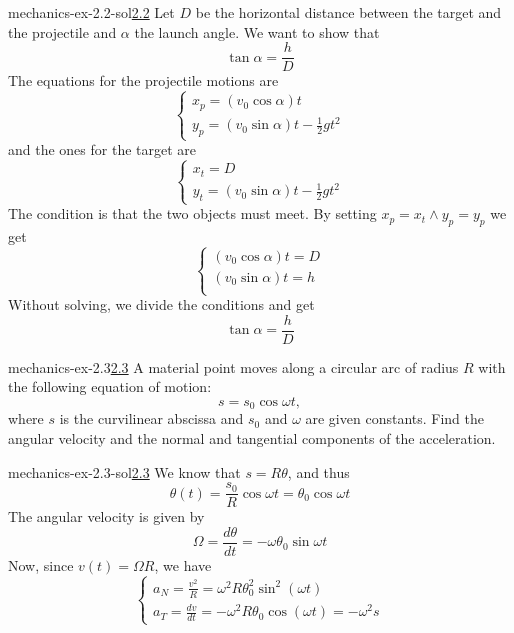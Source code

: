 \documentclass[preview]{standalone}
\begin{document}
\begin{snippetsolution}{mechanics-ex-2.2-sol}{\underline{2.2}}
    Let \(D\) be the horizontal distance between the target and the projectile
    and \(\alpha\) the launch angle.
    We want to show that
    \[
        \tan\alpha = \frac{h}{D}
    \]
    The equations for the projectile motions are
    \[
        \begin{cases}
            x_p = (v_0\cos\alpha)t \\
            y_p = (v_0\sin\alpha)t - \frac{1}{2}gt^2
        \end{cases}
    \]
    and the ones for the target are
    \[
        \begin{cases}
            x_t = D \\
            y_t = (v_0\sin\alpha)t - \frac{1}{2}gt^2
        \end{cases}
    \]
    The condition is that the two objects must meet.
    By setting \(x_p = x_t \land y_p = y_p\) we get
    \[
        \begin{cases}
            (v_0 \cos\alpha) t = D \\
            (v_0 \sin\alpha) t = h \\
        \end{cases}
    \]
    Without solving, we divide the conditions and get
    \[
        \tan\alpha = \frac{h}{D}
    \]
\end{snippetsolution}

\begin{snippetexercise}{mechanics-ex-2.3}{\underline{2.3}}
    A material point moves along a circular arc of radius \(R\) with the following equation of motion:
    \[
        s = s_0 \cos \omega t,
    \]
    where \(s\) is the curvilinear abscissa and \(s_0\) and \(\omega\) are given constants.
    Find the angular velocity and the normal and tangential components of the acceleration.
\end{snippetexercise}

\begin{snippetsolution}{mechanics-ex-2.3-sol}{\underline{2.3}}
    We know that \(s = R\theta\), and thus
    \[
        \theta(t) = \frac{s_0}{R} \cos \omega t = \theta_0 \cos \omega t
    \]
    The angular velocity is given by
    \[
        \Omega = \frac{d\theta}{dt} = -\omega\theta_0\sin\omega t
    \]
    Now, since \(v(t) = \Omega R\), we have
    \[
        \begin{cases}
            a_N = \frac{v^2}{R} = \omega^2 R\theta_0^2 \sin^2(\omega t) \\
            a_T = \frac{dv}{dt} = -\omega^2 R \theta_0 \cos(\omega t) = -\omega^2 s
        \end{cases}
    \]
\end{snippetsolution}
\end{document}

